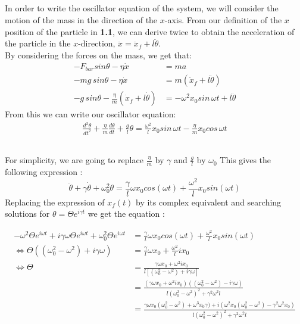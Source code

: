 \documentclass{article}
\begin{document}
\subsection{} %

In order to write the oscillator equation of the system, we will consider the motion of the mass in the direction of the $x$-axis. From our definition of the $x$ position of the particle in \textbf{1.1}, we can derive twice to obtain the acceleration of the particle in the $x$-direction, $\ddot{x} = \ddot{x}_f + l \ddot{\theta}$.\\

\noindent By considering the forces on the mass, we get that:
\begin{align*}
	-F_{bar}sin\theta - \eta \dot{x} &= ma\\
	-mg\,sin\theta - \eta \dot{x} &= m( \ddot{x}_f + l \ddot{\theta})\\
	-g\,sin\theta - \frac{\eta}{m} (\dot{x}_f + l\dot{\theta}) &= -\omega^2x_0sin \, \omega t + l \ddot{\theta}
\end{align*}
From this we can write our oscillator equation:
\begin{align*}
	 \frac{d^2 \theta}{dt^2} + \frac{\eta}{m}\frac{d \theta}{dt} + \frac{g}{l}\theta  = \frac{\omega^2}{l}x_0sin\,\omega t - \frac{\eta}{m}x_0cos\,\omega t 
\end{align*}

\subsection{} %
For simplicity, we are going to replace $\frac{\eta}{m}$ by $\gamma$ and $\frac{g}{l}$ by $\omega_0$
This gives the following expression :
$$\ddot{\theta} + \gamma\dot{\theta} + \omega_0^2\theta = \frac{\gamma}{l}\omega x_0 cos(\omega t) + \frac{\omega^2}{l}x_0sin(\omega t) $$
Replacing the expression of $x_f(t)$ by its complex equivalent and searching solutions for $\theta = \Theta e^{i\gamma t}$ we get the equation :

\begin{align*}
-\omega^2\Theta e^{i\omega t} + i\gamma \omega \Theta e^{i\omega t} + \omega_0^2\Theta e^{i\omega t} &= \frac{\gamma}{l}\omega x_0 cos(\omega t) + \frac{\omega^2}{l}x_0sin(\omega t) \\
\Leftrightarrow \Theta ((\omega_0^2 - \omega ^2) + i\gamma \omega) &= \frac{\gamma}{l} \omega x_0 + \frac{\omega^2}{l} ix_0 \\
\Leftrightarrow \Theta &= \frac{\gamma \omega x_0 + \omega^2 i x_0}{l[(\omega_0^2 - \omega^2) + i\gamma \omega]} \\
&=\frac{(\gamma \omega x_0 + \omega^2 i x_0)((\omega_0^2-\omega^2)-i\gamma \omega)}{l(\omega_0^2 - \omega^2)^2 + \gamma^2 \omega^2l} \\
&= \frac{\gamma \omega x_0 (\omega_0^2 - \omega^2) + \omega^3 x_0 \gamma) + i(\omega^2x_0(\omega_0^2-\omega^2) - \gamma^2\omega^2x_0)}{l(\omega_0^2 - \omega^2)^2 + \gamma^2 \omega^2l} \\
\end{align*}
\end{document}
